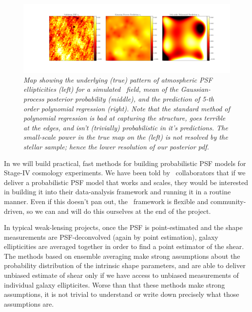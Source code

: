 \documentclass[12pt]{article}
\begin{document}
\begin{figure}[!ht]
\noindent\minipage{\textwidth}
  \includegraphics[width=\linewidth]{validation_e1.png}
\endminipage
\caption{\textsl{Map showing the underlying (true) pattern of atmospheric PSF ellipticities (left) for a simulated \lsst\ field,
mean of the Gaussian-process posterior probability (middle), and the prediction of 5-th
order polynomial regression (right).  Note that the standard method of polynomial regression is bad at capturing the structure, goes terrible at the edges, and isn't (trivially) probabilistic in it's predictions.  The small-scale power in the true map on the (left) is not resolved by the stellar sample; hence the lower resolution of our posterior pdf.}\label{3}}
\end{figure}

In  we will build practical, fast methods for
building probabilistic PSF models for Stage-IV cosmology experiments.
We have been told by \lsst\ collaborators that if we deliver a
probabilistic PSF model that works and scales, they would be
interested in building it into their data-analysis framework and
running it in a routine manner.  Even if this doesn't pan out, the
\lsst\ framework is flexible and community-driven, so we can and will
do this ourselves at the end of the project.

In typical weak-lensing projects, once the PSF is point-estimated
and the shape measurements are PSF-deconvolved (again by point estimation),
galaxy ellipticities
are averaged together in order to
find a point estimator of the shear.
The methods based on ensemble averaging make strong assumptions
about the probability distribution of the intrinsic shape parameters,
and are able to deliver unbiased estimate of shear only if we
have access to unbiased measurements of individual galaxy
ellipticites.
Worse than that these methods make strong assumptions, it is not
trivial to understand or write down precisely what those assumptions
are.
\end{document}
